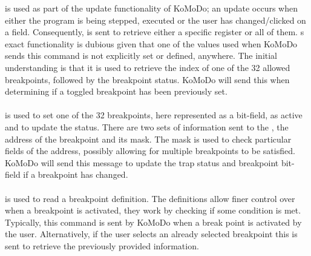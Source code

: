 %
 is used as part of the update functionality of KoMoDo; an update occurs when either the program is being stepped, executed or the user has changed/clicked on a field. Consequently,  is sent to retrieve either a specific register or all of them.
%
%
%
\pagebreak
{}
%
s exact functionality is dubious given that one of the values used when KoMoDo sends this command is not explicitly set or defined, anywhere. The initial understanding is that it is used to retrieve the index of one of the 32 allowed breakpoints, followed by the breakpoint status. KoMoDo will send this when determining if a toggled breakpoint has been previously set.\\\\
%
 is used to set one of the 32 breakpoints, here represented as a bit-field, as active and to update the status. There are two sets of information sent to the , the address of the breakpoint and its mask. The mask is used to check particular fields of the address, possibly allowing for multiple breakpoints to be satisfied. KoMoDo will send this message to update the trap status and breakpoint bit-field if a breakpoint has changed.\\\\
%
 is used to read a breakpoint definition. The definitions allow finer control over when a breakpoint is activated, they work by checking if some condition is met. Typically, this command is sent by KoMoDo when a break point is activated by the user. Alternatively, if the user selects an already selected breakpoint this is sent to retrieve the previously provided information.\\\\
